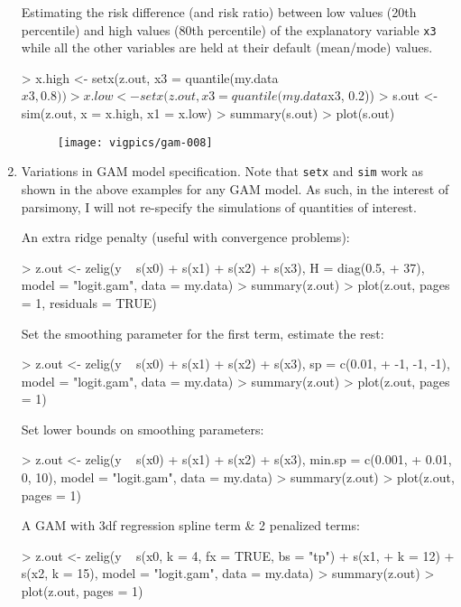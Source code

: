 \begin{enumerate}
Estimating the risk difference (and risk ratio) between low values (20th percentile) and high values (80th percentile) of the explanatory variable {\tt x3} while all the other variables are held at their default (mean/mode) values. 

\begin{Schunk}
\begin{Sinput}
> x.high <- setx(z.out, x3 = quantile(my.data$x3, 0.8))
> x.low <- setx(z.out, x3 = quantile(my.data$x3, 0.2))
> s.out <- sim(z.out, x = x.high, x1 = x.low)
> summary(s.out)
> plot(s.out)
\end{Sinput}
\end{Schunk}
\begin{figure}[here]
\centering
\texttt{[image: vigpics/gam-008]}
\label{fig:plotgam}
\end{figure}

\item Variations in GAM model specification. Note that {\tt setx} and {\tt sim} work as shown in the above examples for any GAM model. As such, in the interest of parsimony, I will not re-specify the simulations of quantities of interest. 

An extra ridge penalty (useful with convergence problems):
\begin{Schunk}
\begin{Sinput}
> z.out <- zelig(y ~ s(x0) + s(x1) + s(x2) + s(x3), H = diag(0.5, 
+     37), model = "logit.gam", data = my.data)
> summary(z.out)
> plot(z.out, pages = 1, residuals = TRUE)
\end{Sinput}
\end{Schunk}
Set the smoothing parameter for the first term, estimate the rest:
\begin{Schunk}
\begin{Sinput}
> z.out <- zelig(y ~ s(x0) + s(x1) + s(x2) + s(x3), sp = c(0.01, 
+     -1, -1, -1), model = "logit.gam", data = my.data)
> summary(z.out)
> plot(z.out, pages = 1)
\end{Sinput}
\end{Schunk}
Set lower bounds on smoothing parameters:
\begin{Schunk}
\begin{Sinput}
> z.out <- zelig(y ~ s(x0) + s(x1) + s(x2) + s(x3), min.sp = c(0.001, 
+     0.01, 0, 10), model = "logit.gam", data = my.data)
> summary(z.out)
> plot(z.out, pages = 1)
\end{Sinput}
\end{Schunk}
A GAM with 3df regression spline term \& 2 penalized terms:
\begin{Schunk}
\begin{Sinput}
> z.out <- zelig(y ~ s(x0, k = 4, fx = TRUE, bs = "tp") + s(x1, 
+     k = 12) + s(x2, k = 15), model = "logit.gam", data = my.data)
> summary(z.out)
> plot(z.out, pages = 1)
\end{Sinput}
\end{Schunk}
\end{enumerate}



